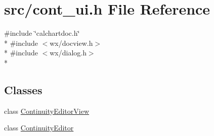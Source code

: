 \hypertarget{a00193}{\section{src/cont\-\_\-ui.h File Reference}
\label{a00193}
}
{\ttfamily \#include \char`\"{}calchartdoc.\-h\char`\"{}}\\*
{\ttfamily \#include $<$wx/docview.\-h$>$}\\*
{\ttfamily \#include $<$wx/dialog.\-h$>$}\\*
\subsection*{Classes}
\begin{DoxyCompactItemize}
\item 
class \hyperlink{a00060}{Continuity\-Editor\-View}
\item 
class \hyperlink{a00059}{Continuity\-Editor}
\end{DoxyCompactItemize}
